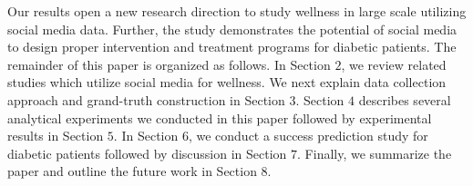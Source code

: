 \documentclass{acm_proc_article-sp}
\begin{document}
Our results open a new research direction to study wellness in large scale utilizing social media data. Further, the study demonstrates the potential of social media to design proper intervention and treatment programs for diabetic patients. The remainder of this paper is organized as follows. In Section $2$, we review related studies which utilize social media for wellness. We next explain data collection approach and grand-truth construction in Section $3$. Section $4$ describes several analytical experiments we conducted in this paper followed by experimental results in Section $5$. In Section $6$, we conduct a success prediction study for diabetic patients followed by discussion in Section $7$. Finally, we summarize the paper and outline the future work in Section $8$.


%
%
%
%
%
%
\end{document}
